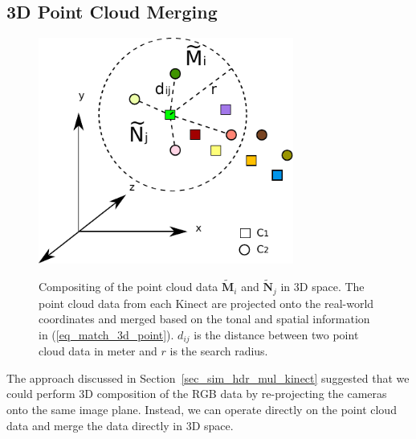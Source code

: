 \subsection{3D Point Cloud Merging}
\begin{figure}
\centering
\includegraphics[width=3.3in]{ch4/diagrams/3d_data_structure.pdf} \\
\caption{Compositing of the point cloud data $\mathbf{\tilde{M}}_i$ and $\mathbf{\tilde{N}}_j$ in 3D space. The point cloud data from each Kinect are projected onto the real-world coordinates and merged based on the tonal and spatial information in (\ref{eq_match_3d_point}). $d_{ij}$ is the distance between two point cloud data in meter and $r$ is the search radius.}
\label{fig_3D_structure}
\end{figure}
The approach discussed in Section~\ref{sec_sim_hdr_mul_kinect} suggested that we could perform 3D composition of the RGB data by re-projecting the cameras onto the same image plane. Instead, we can operate directly on the point cloud data and merge the data directly in 3D space.

